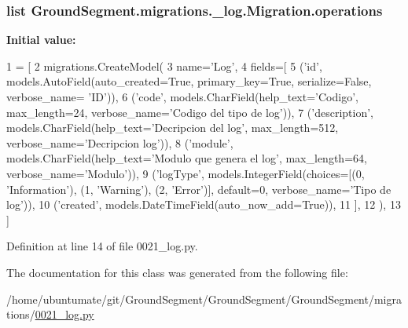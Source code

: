 \hypertarget{class_ground_segment_1_1migrations_1_10021__log_1_1_migration_a429ec7a18555ddbde877be5a7445f190}{}
\subsubsection[{operations}]{\setlength{\rightskip}{0pt plus 5cm}list Ground\+Segment.\+migrations.\+\_\+log.\+Migration.\+operations\hspace{0.3cm}{\ttfamily [static]}}\label{class_ground_segment_1_1migrations_1_10021__log_1_1_migration_a429ec7a18555ddbde877be5a7445f190}
{\bfseries Initial value\+:}
\begin{DoxyCode}
1 = [
2         migrations.CreateModel(
3             name=\textcolor{stringliteral}{'Log'},
4             fields=[
5                 (\textcolor{stringliteral}{'id'}, models.AutoField(auto\_created=\textcolor{keyword}{True}, primary\_key=\textcolor{keyword}{True}, serialize=\textcolor{keyword}{False}, verbose\_name=\textcolor{stringliteral}{
      'ID'})),
6                 (\textcolor{stringliteral}{'code'}, models.CharField(help\_text=\textcolor{stringliteral}{'Codigo'}, max\_length=24, verbose\_name=\textcolor{stringliteral}{'Codigo del tipo
       de log'})),
7                 (\textcolor{stringliteral}{'description'}, models.CharField(help\_text=\textcolor{stringliteral}{'Decripcion del log'}, max\_length=512, 
      verbose\_name=\textcolor{stringliteral}{'Decripcion log'})),
8                 (\textcolor{stringliteral}{'module'}, models.CharField(help\_text=\textcolor{stringliteral}{'Modulo que genera el log'}, max\_length=64, 
      verbose\_name=\textcolor{stringliteral}{'Modulo'})),
9                 (\textcolor{stringliteral}{'logType'}, models.IntegerField(choices=[(0, \textcolor{stringliteral}{'Information'}), (1, \textcolor{stringliteral}{'Warning'}), (2, \textcolor{stringliteral}{'Error'})],
       default=0, verbose\_name=\textcolor{stringliteral}{'Tipo de log'})),
10                 (\textcolor{stringliteral}{'created'}, models.DateTimeField(auto\_now\_add=\textcolor{keyword}{True})),
11             ],
12         ),
13     ]
\end{DoxyCode}


Definition at line 14 of file 0021\+\_\+log.\+py.



The documentation for this class was generated from the following file\+:\begin{DoxyCompactItemize}
\item 
/home/ubuntumate/git/\+Ground\+Segment/\+Ground\+Segment/\+Ground\+Segment/migrations/\hyperlink{0021__log_8py}{0021\+\_\+log.\+py}\end{DoxyCompactItemize}
